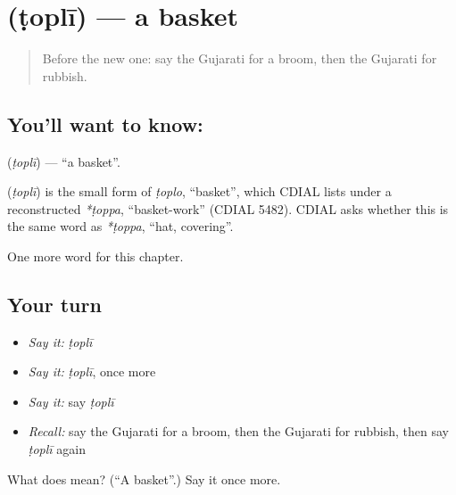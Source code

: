 \section[\texorpdfstring{\gu{ટોપલી} (ṭoplī)}{ટોપલી (ṭoplī)}]{ (ṭoplī) — a basket}

\label{lesson:GU-C109-topli}



\begin{quote}
Before the new one: say the Gujarati for a broom, then the Gujarati for rubbish.
\end{quote}

\subsection*{You'll want to know: }
\textbf{} (\emph{ṭoplī}) — \textquotedblleft{}a basket\textquotedblright{}.

\begin{cousinweb}
\textbf{} (\emph{ṭoplī}) is the small form of \emph{ṭoplo}, \textquotedblleft{}basket\textquotedblright{}, which CDIAL lists under a reconstructed \emph{*ṭoppa}, \textquotedblleft{}basket-work\textquotedblright{} (CDIAL 5482). CDIAL asks whether this is the same word as \emph{*ṭoppa}, \textquotedblleft{}hat, covering\textquotedblright{}.
\end{cousinweb}

\begin{grammarlens}[title={What you've built}]
One more word for this chapter.
\end{grammarlens}

\subsection*{Your turn}
\begin{itemize}
\raggedright
  \item \emph{Say it:} \emph{ṭoplī}
  \item \emph{Say it:} \emph{ṭoplī}, once more
  \item \emph{Say it:} say \emph{ṭoplī}
  \item \emph{Recall:} say the Gujarati for a broom, then the Gujarati for rubbish, then say \emph{ṭoplī} again
\end{itemize}

\begin{tcolorbox}[breakable,colback=teal!4,colframe=teal!35!black,title={Before you move on}]
What does  mean? (\textquotedblleft{}A basket\textquotedblright{}.) Say it once more.
\end{tcolorbox}
